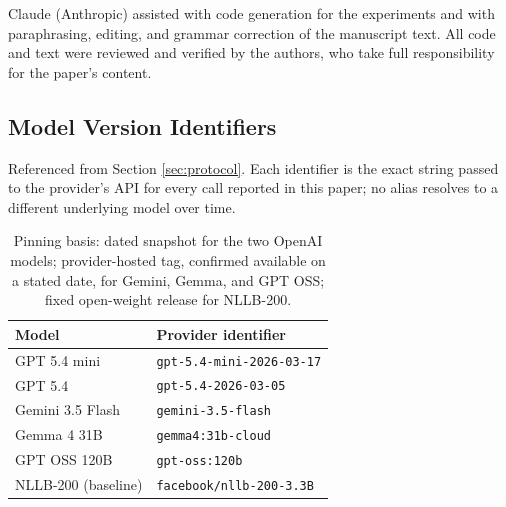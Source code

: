 \documentclass[pdflatex,sn-mathphys-ay]{sn-jnl}
\begin{document}
Claude (Anthropic) assisted with code generation for the experiments and with paraphrasing, editing, and grammar correction of the manuscript text. All code and text were reviewed and verified by the authors, who take full responsibility for the paper's content.

\begin{appendices}

\section{Model Version Identifiers}
\label{sec:appendix-a}

Referenced from Section \ref{sec:protocol}. Each identifier is the exact string passed to the provider's API for every call reported in this paper; no alias resolves to a different underlying model over time.

\begin{table}[h]
\centering
\small
\begin{tabular}{ll}
\toprule
\textbf{Model} & \textbf{Provider identifier} \\
\midrule
GPT 5.4 mini & \texttt{gpt-5.4-mini-2026-03-17} \\
GPT 5.4 & \texttt{gpt-5.4-2026-03-05} \\
Gemini 3.5 Flash & \texttt{gemini-3.5-flash} \\
Gemma 4 31B & \texttt{gemma4:31b-cloud} \\
GPT OSS 120B & \texttt{gpt-oss:120b} \\
NLLB-200 (baseline) & \texttt{facebook/nllb-200-3.3B} \\
\bottomrule
\end{tabular}
\caption{Pinning basis: dated snapshot for the two OpenAI models; provider-hosted tag, confirmed available on a stated date, for Gemini, Gemma, and GPT OSS; fixed open-weight release for NLLB-200.}
\label{tab:appendix-ids}
\end{table}

\end{appendices}


\end{document}
